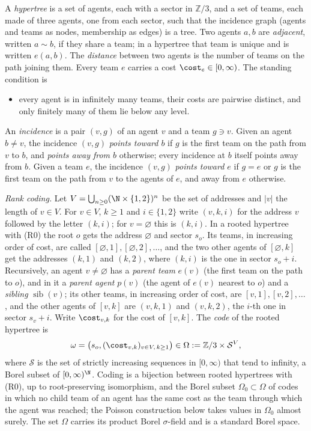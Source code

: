 A \emph{hypertree} is a set of agents, each with a sector in $\mathbb{Z}/3$, and a set of
teams, each made of three agents, one from each sector, such that the incidence graph
(agents and teams as nodes, membership as edges) is a tree. Two agents $a,b$ are
\emph{adjacent}, written $a\sim b$, if they share a team; in a hypertree that team is unique
and is written $e(a,b)$. The \emph{distance} between two agents is the number of teams on the
path joining them. Every team $e$ carries a cost $\cost_e\in[0,\infty)$. The standing
condition is
\begin{itemize}
\item[(R0)] every agent is in infinitely many teams, their costs are pairwise distinct, and
only finitely many of them lie below any level.
\end{itemize}
An \emph{incidence} is a pair $(v,g)$ of an agent $v$ and a team $g\ni v$. Given an agent
$b\neq v$, the incidence $(v,g)$ \emph{points toward $b$} if $g$ is the first team on the
path from $v$ to $b$, and \emph{points away from $b$} otherwise; every incidence at $b$
itself points away from $b$. Given a team $e$, the incidence $(v,g)$ \emph{points toward $e$}
if $g=e$ or $g$ is the first team on the path from $v$ to the agents of $e$, and away from $e$
otherwise.

\emph{Rank coding.} Let $V=\bigcup_{n\ge0}(\N\times\{1,2\})^n$ be the set of addresses and
$|v|$ the length of $v\in V$. For $v\in V$, $k\ge1$ and $i\in\{1,2\}$ write $(v,k,i)$ for the
address $v$ followed by the letter $(k,i)$; for $v=\varnothing$ this is $(k,i)$. In a rooted
hypertree with (R0) the root $o$ gets the address $\varnothing$ and sector $s_o$. Its teams, in
increasing order of cost, are called $[\varnothing,1],[\varnothing,2],\dots$, and the two
other agents of $[\varnothing,k]$ get the addresses $(k,1)$ and $(k,2)$, where $(k,i)$ is the
one in sector $s_o+i$. Recursively, an agent $v\neq\varnothing$ has a \emph{parent team}
$e(v)$ (the first team on the path to $o$), and in it a \emph{parent agent} $p(v)$ (the agent
of $e(v)$ nearest to $o$) and a \emph{sibling} $\operatorname{sib}(v)$; its other teams, in
increasing order of cost, are $[v,1],[v,2],\dots$, and the other agents of $[v,k]$ are
$(v,k,1)$ and $(v,k,2)$, the $i$-th one in sector $s_v+i$. Write $\cost_{v,k}$ for the cost of
$[v,k]$. The \emph{code} of the rooted hypertree is
\[
  \omega=\bigl(s_o,(\cost_{v,k})_{v\in V,\,k\ge1}\bigr)\in\Omega:=\mathbb{Z}/3\times\mathcal{S}^V ,
\]
where $\mathcal{S}$ is the set of strictly increasing sequences in $[0,\infty)$ that tend to
infinity, a Borel subset of $[0,\infty)^{\N}$. Coding is a bijection between rooted hypertrees
with (R0), up to root-preserving isomorphism, and the Borel subset $\Omega_0\subset\Omega$ of
codes in which no child team of an agent has the same cost as the team through which the
agent was reached; the Poisson construction below takes values in $\Omega_0$ almost surely. The set $\Omega$ carries its
product Borel $\sigma$-field and is a standard Borel space.

